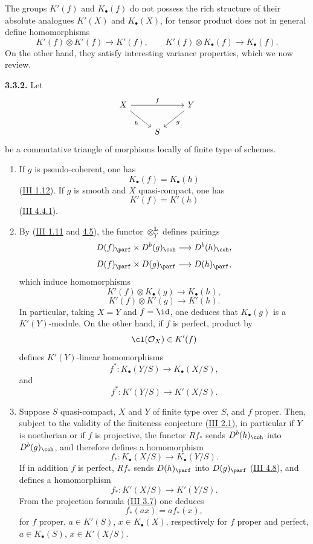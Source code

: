 The groups \(K'(f)\) and \(K_{\bullet}(f)\) do not possess the rich structure of their absolute analogues \(K'(X)\) and \(K_{\bullet}(X)\), for tensor product does not in general define homomorphisms
\[
 K'(f)\otimes K'(f)\longrightarrow K'(f),
 \qquad
 K'(f)\otimes K_{\bullet}(f)\longrightarrow K_{\bullet}(f).
\]
On the other hand, they satisfy interesting variance properties, which we now review.

\textbf{3.3.2.} Let
\[
\begin{tikzcd}
X\arrow[rr,"f"]\arrow[dr,"h"'] &&Y\arrow[dl,"g"]\\
&S&
\end{tikzcd}
\]
be a commutative triangle of morphisms locally of finite type of schemes.
\begin{enumerate}[label=\textbf{3.3.2.\arabic*.}, leftmargin=4em]
\item If \(g\) is pseudo-coherent, one has
\[
 K_{\bullet}(f)=K_{\bullet}(h)
\]
(\hyperlink{sga6.e03.cor.1-12}{III 1.12}). If \(g\) is smooth and \(X\) quasi-compact, one has
\[
 K'(f)=K'(h)
\]
(\hyperlink{sga6.e03.prop.4-4}{III 4.4.1}).

\item By (\hyperlink{sga6.e03.prop.1-11}{III 1.11} and \hyperlink{sga6.e03.prop.4-5}{4.5}), the functor \(\otimes_Y^{\mathbf L}\) defines pairings
\[
 D(f)_{\parf}\times D^b(g)_{\coh}\longrightarrow D^b(h)_{\coh},
\]
\[
 D(f)_{\parf}\times D(g)_{\parf}\longrightarrow D(h)_{\parf},
\]
which induce homomorphisms
\[
 K'(f)\otimes K_{\bullet}(g)\longrightarrow K_{\bullet}(h),
\]
\[
 K'(f)\otimes K'(g)\longrightarrow K'(h).
\]
In particular, taking \(X=Y\) and \(f=\id\), one deduces that \(K_{\bullet}(g)\) is a \(K'(Y)\)-module. On the other hand, if \(f\) is perfect, product by
\[
 \cl(\mathcal O_X)\in K'(f)
\]
defines \(K'(Y)\)-linear homomorphisms
\[
 f^*:K_{\bullet}(Y/S)\longrightarrow K_{\bullet}(X/S),
\]
and
\[
 f^*:K'(Y/S)\longrightarrow K'(X/S).
\]

\item Suppose \(S\) quasi-compact, \(X\) and \(Y\) of finite type over \(S\), and \(f\) proper. Then, subject to the validity of the finiteness conjecture (\hyperlink{sga6.e03.conj.2-1}{III 2.1}), in particular if \(Y\) is noetherian or if \(f\) is projective, the functor \(Rf_*\) sends \(D^b(h)_{\coh}\) into \(D^b(g)_{\coh}\), and therefore defines a homomorphism
\[
 f_*:K_{\bullet}(X/S)\longrightarrow K_{\bullet}(Y/S).
\]
If in addition \(f\) is perfect, \(Rf_*\) sends \(D(h)_{\parf}\) into \(D(g)_{\parf}\) (\hyperlink{sga6.e03.prop.4-8}{III 4.8}), and defines a homomorphism
\[
 f_*:K'(X/S)\longrightarrow K'(Y/S).
\]
From the projection formula (\hyperlink{sga6.e03.prop.3-7}{III 3.7}) one deduces
\[
 f_*(a x)=a f_*(x),
\]
for \(f\) proper, \(a\in K'(S)\), \(x\in K_{\bullet}(X)\), respectively for \(f\) proper and perfect, \(a\in K_{\bullet}(S)\), \(x\in K'(X/S)\).


\end{enumerate}
